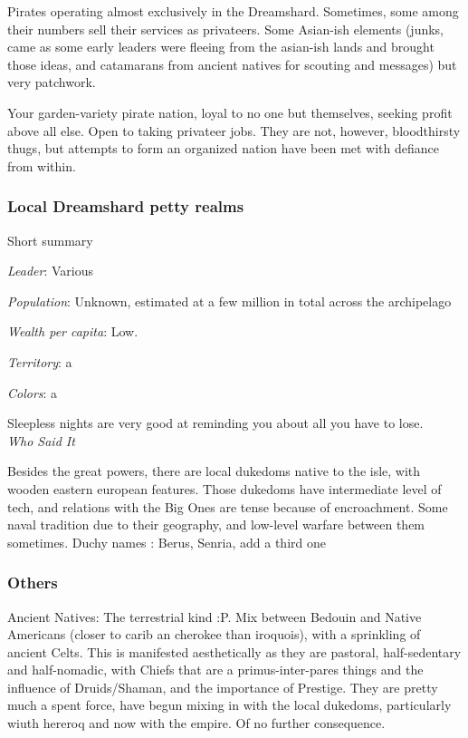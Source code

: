Pirates operating almost exclusively in the Dreamshard. Sometimes, some among their numbers sell their services as privateers. Some Asian-ish elements (junks, came as some early leaders were fleeing from the asian-ish lands and brought those ideas, and catamarans from ancient natives for scouting and messages) but very patchwork. 

	
Your garden-variety pirate nation, loyal to no one but themselves, seeking profit above all else. Open to taking privateer jobs. They are not, however, bloodthirsty thugs, but attempts to form an organized nation have been met with defiance from within.






\subsubsection{Local Dreamshard petty realms}


Short summary

\textit{Leader}: Various

\textit{Population}: Unknown, estimated at a few million in total across the archipelago

\textit{Wealth per capita}: Low.

\textit{Territory}: a
    
\textit{Colors}: a

\begin{rpg-quotebox}
    Sleepless nights are very good at reminding you about all you have to lose. \\ \textendash \textit{Who Said It}
\end{rpg-quotebox}

Besides the great powers, there are local dukedoms native to the isle, with wooden eastern european features. Those dukedoms have intermediate level of tech, and relations with the Big Ones are tense because of encroachment. Some naval tradition due to their geography, and low-level warfare between them sometimes.
	Duchy names : Berus, Senria, add a third one

\subsubsection{Others}



Ancient Natives: The terrestrial kind :P. Mix between Bedouin and Native Americans (closer to carib an cherokee than iroquois), with a sprinkling of ancient Celts. This is manifested aesthetically as they are pastoral, half-sedentary and half-nomadic, with Chiefs that are a primus-inter-pares things and the influence of Druids/Shaman, and the importance of Prestige. They are pretty much a spent force, have begun mixing in with the local dukedoms, particularly wiuth hereroq and now with the empire. Of no further consequence.

